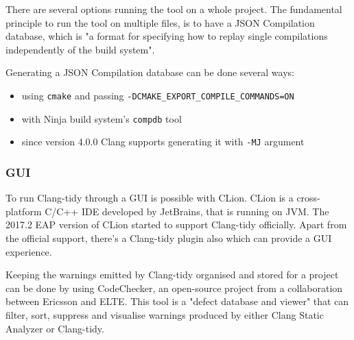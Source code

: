 \par There are several options running the tool on a whole project. The fundamental principle to run the tool on multiple files, is to have a JSON Compilation database, which is "a format for specifying how to replay single compilations independently of the build system"\cite{compilation_db}.
\par Generating a JSON Compilation database can be done several ways:
\begin{itemize}
    \item using \verb|cmake| and passing \verb|-DCMAKE_EXPORT_COMPILE_COMMANDS=ON|
    \item with Ninja build system's \verb|compdb| tool\cite{ninja_build_system}
    \item since version 4.0.0 Clang supports generating it with \verb|-MJ| argument\cite{clang_release_notes}
\end{itemize}
\subsubsection{GUI}
\par To run Clang-tidy through a GUI is possible with CLion. CLion is a cross-platform C/C++ IDE developed by JetBrains, that is running on JVM. The 2017.2 EAP version of CLion started to support Clang-tidy officially\cite{clion_tidy_eap}. Apart from the official support, there's a Clang-tidy plugin\cite{clion_tidy_plugin} also which can provide a GUI experience. \medskip
\par Keeping the warnings emitted by Clang-tidy organised and stored for a project can be done by using CodeChecker\cite{codechecker_gsd}, an open-source project from a collaboration between Ericsson and ELTE. This tool is a "defect database and viewer"\cite{codechecker} that can filter, sort, suppress and visualise warnings produced by either Clang Static Analyzer or Clang-tidy.
